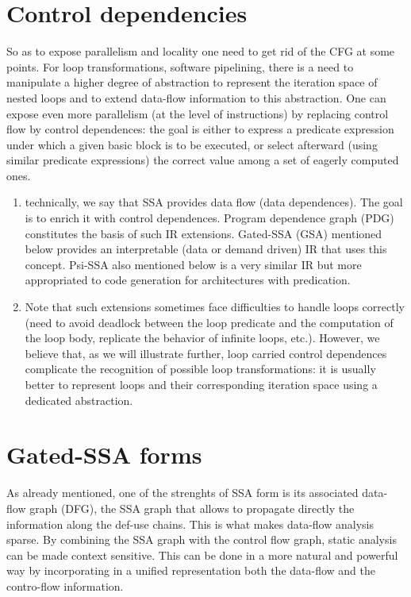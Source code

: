 \section{Control dependencies}
So as to expose parallelism and locality one need to get rid of the CFG at some points. 
For loop transformations, software pipelining, there is a need to manipulate a higher degree of abstraction to represent the iteration space of nested loops and to extend data-flow information to this abstraction. 
One can expose even more parallelism (at the level of instructions) by replacing control flow by control dependences: 
the goal is either to express a predicate expression under which a given basic block is to be executed, or select afterward (using similar predicate expressions) the correct value among a set of eagerly computed ones.
\begin{enumerate}
\item technically, we say that SSA provides data flow (data dependences). 
  The goal is to enrich it with control dependences. 
  Program dependence graph (PDG) constitutes the basis of such IR extensions. 
  Gated-SSA (GSA) mentioned below provides an interpretable (data or demand driven) IR that uses this concept. 
  Psi-SSA also mentioned below is a very similar IR but more appropriated to code generation for architectures with predication. 
\item Note that such extensions sometimes face difficulties to handle loops correctly (need to avoid deadlock between the loop predicate and the computation of the loop body, replicate the behavior of infinite loops, etc.). 
  However, we believe that, as we will illustrate further, loop carried control dependences complicate the recognition of possible loop transformations: 
  it is usually better to represent loops and their corresponding iteration space using a dedicated abstraction.
\end{enumerate}

\section{Gated-SSA forms}
As already mentioned, one of the strenghts of SSA form is its associated data-flow graph (DFG), the SSA graph that allows to propagate directly the information along the def-use chains.
This is what makes data-flow analysis sparse.
By combining the SSA graph with the control flow graph, static analysis can be made context sensitive.
This can be done in a more natural and powerful way by incorporating in a unified representation both the data-flow and the contro-flow information.

